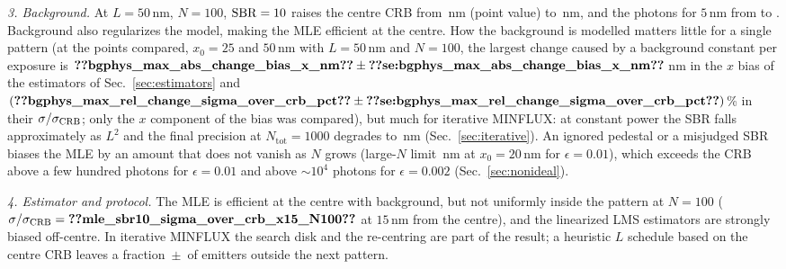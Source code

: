 \emph{3. Background.} At $L=50$\,nm, $N=100$, $\mathrm{SBR}=10$ raises the centre CRB from
\,nm (point value)
to \,nm, and the photons
for $5$\,nm from  to
. Background also regularizes the
model, making the MLE efficient at the centre. How the background is modelled matters little
for a single pattern (at the points compared, $x_0=25$ and $50$\,nm with $L=50$\,nm and
$N=100$, the largest change caused by a background constant per exposure is
$\pnum{bgphys_max_abs_change_bias_x_nm}\pm\pnumse{bgphys_max_abs_change_bias_x_nm}$\,nm in the $x$ bias of the estimators of Sec.~\ref{sec:estimators} and
$(\pnum{bgphys_max_rel_change_sigma_over_crb_pct}\pm\pnumse{bgphys_max_rel_change_sigma_over_crb_pct})$\% in their $\sigma/\sigma_{\mathrm{CRB}}$;
only the $x$ component of the bias was compared), but much for iterative MINFLUX: at constant power
the SBR falls approximately as $L^2$ and the final precision at $N_{\mathrm{tot}}=1000$ degrades to
\,nm
(Sec.~\ref{sec:iterative}). An ignored pedestal or a misjudged SBR biases the MLE by an amount
that does not vanish as $N$ grows (large-$N$ limit \,nm
at $x_0=20$\,nm for $\epsilon=0.01$), which exceeds the CRB above a few hundred photons for $\epsilon=0.01$ and above
$\sim10^4$ photons for $\epsilon=0.002$ (Sec.~\ref{sec:nonideal}).

\emph{4. Estimator and protocol.} The MLE is efficient at the centre with background, but not
uniformly inside the pattern at $N=100$
($\sigma/\crb=\pnum{mle_sbr10_sigma_over_crb_x15_N100}\src{mle_sbr10_sigma_over_crb_x15_N100}$
at $15$\,nm from the centre), and the linearized LMS estimators are strongly biased off-centre.
In iterative MINFLUX the search disk and the re-centring are part of the result; a heuristic
$L$ schedule based on the centre CRB leaves a fraction
\,$\pm$\, of emitters
outside the next pattern.

